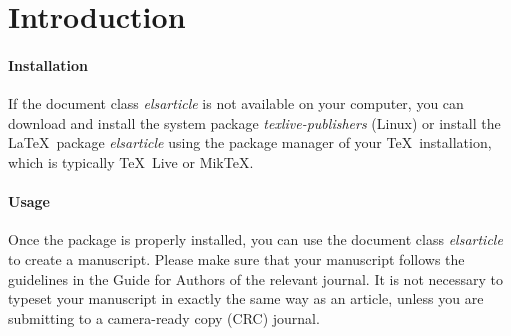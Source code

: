 \section{Introduction}


%
\paragraph{Installation} If the document class \emph{elsarticle} is not available on your computer, you can download and install the system package \emph{texlive-publishers} (Linux) or install the \LaTeX\ package \emph{elsarticle} using the package manager of your \TeX\ installation, which is typically \TeX\ Live or Mik\TeX.

\paragraph{Usage} Once the package is properly installed, you can use the document class \emph{elsarticle} to create a manuscript. Please make sure that your manuscript follows the guidelines in the Guide for Authors of the relevant journal. It is not necessary to typeset your manuscript in exactly the same way as an article, unless you are submitting to a camera-ready copy (CRC) journal.

